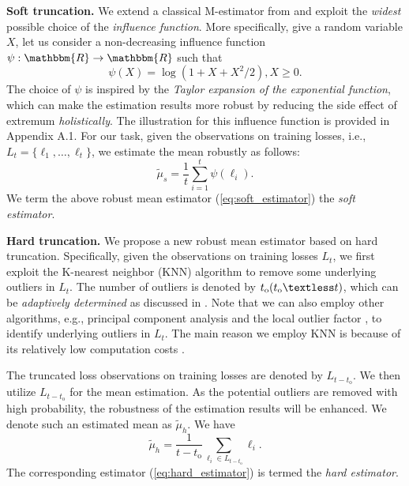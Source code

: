 \documentclass[11pt]{article}
\begin{document}
\textbf{Soft truncation.} We extend a classical M-estimator from \citep{catoni2012challenging} and exploit the \textit{widest} possible choice of the \textit{influence function}. More specifically, give a random variable $X$, let us consider a non-decreasing influence function $\psi:\mathbbm{R}\rightarrow\mathbbm{R}$ such that
\begin{equation}
    \psi(X)=\log(1+X+X^2/2),X\geq 0.
\end{equation}
The choice of $\psi$ is inspired by the \textit{Taylor expansion of the exponential function}, which can make the estimation results more robust by reducing the side effect of extremum \textit{holistically}. The illustration for this influence function is provided in Appendix A.1. For our task, given the observations on training losses, i.e., $L_t=\{\ell_1,\ldots,\ell_t\}$, we estimate the mean robustly as follows:
\begin{equation}\label{eq:soft_estimator}
    \tilde{\mu}_s=\frac{1}{t}\sum_{i=1}^t \psi(\ell_i).
\end{equation}
We term the above robust mean estimator (\ref{eq:soft_estimator}) the \textit{soft estimator}. 

\textbf{Hard truncation.} We propose a new robust mean estimator based on hard truncation. Specifically, given the observations on training losses $L_t$, we first exploit the K-nearest neighbor (KNN) algorithm \citep{liao2002use} to remove some underlying outliers in $L_t$. The number of outliers is denoted by $t_\mathrm{o}  (t_\mathrm{o}\textless t)$, which can be \textit{adaptively determined} as discussed in \citep{zhao2019pyod}. 
Note that we can also employ other algorithms, e.g., principal component analysis \citep{shyu2003novel} and the local outlier factor \citep{breunig2000lof}, to identify underlying outliers in $L_t$. The main reason we employ KNN is because of its relatively low computation costs \citep{zhao2019pyod}. 

The truncated loss observations on training losses are denoted by $L_{t-t_\mathrm{o}}$. We then utilize $L_{t-t_\mathrm{o}}$ for the mean estimation. As the potential outliers are removed with high probability, the robustness of the estimation results will be enhanced. We denote such an estimated mean as $\tilde{\mu}_h$. We have 
\begin{equation}\label{eq:hard_estimator}
    \tilde{\mu}_h=\frac{1}{t-t_\mathrm{o}}\sum_{\ell_i\in L_{t-t_\mathrm{o}}}\ell_i.
\end{equation}
The corresponding estimator (\ref{eq:hard_estimator}) is termed the \textit{hard estimator}.
\end{document}
